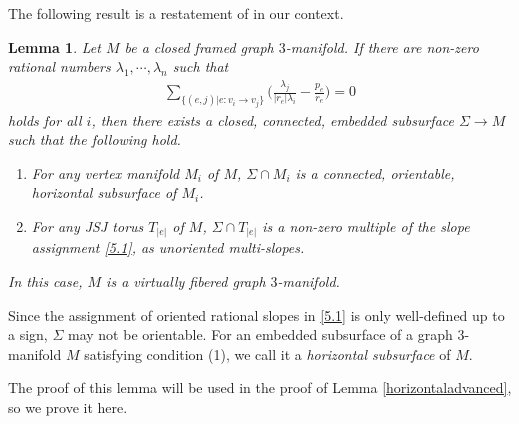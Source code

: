 \documentclass{amsart}
\numberwithin{equation}{section}
\newtheorem{lemma}[theorem]{Lemma}
\theoremstyle{definition}
\begin{document}
The following result is a restatement of \cite[Lemma 1.4]{WY} in our context.
\begin{lemma}\label{horizontalbasic}
Let $M$ be a closed framed graph $3$-manifold. If there are non-zero rational numbers $\lambda_1,\cdots,\lambda_n$ such that 
\begin{align}\label{5.2}
\sum_{\{(e,j)|e:v_i\to v_j\}}\Big(\frac{\lambda_j}{ |r_e|\lambda_i}-\frac{p_e}{r_e}\Big)=0
\end{align}
holds for all $i$, then there exists a closed, connected, embedded subsurface $\Sigma\to M$ such that the following hold.
\begin{enumerate}
\item For any vertex manifold $M_i$ of $M$, $\Sigma\cap M_i$ is a connected, orientable, horizontal subsurface of $M_i$.
\item For any JSJ torus $T_{|e|}$ of $M$, $\Sigma\cap T_{|e|}$ is a non-zero multiple of the slope assignment \eqref{5.1}, as unoriented multi-slopes.
\end{enumerate}
In this case, $M$ is a virtually fibered graph $3$-manifold.
\end{lemma}

Since the assignment of oriented rational slopes in \eqref{5.1} is only well-defined up to a sign, $\Sigma$ may not be orientable. For an embedded subsurface of a graph $3$-manifold $M$ satisfying condition (1), we call it a {\it horizontal subsurface} of $M$.

The proof of this lemma will be used in the proof of Lemma \ref{horizontaladvanced}, so we prove it here.
\end{document}
